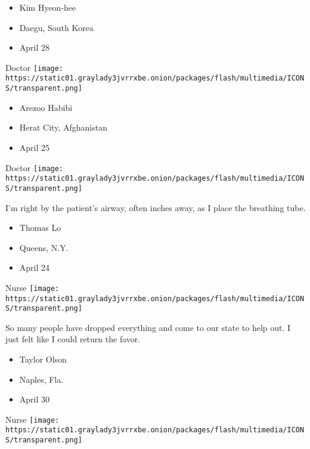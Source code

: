 \begin{itemize}
\tightlist
\item
  Kim Hyeon-hee
\item
  Daegu, South Korea
\item
  April 28
\end{itemize}

\protect\hyperlink{item-arezoo-habibi}{}

Doctor
\texttt{[image: https://static01.graylady3jvrrxbe.onion/packages/flash/multimedia/ICONS/transparent.png]}

\begin{itemize}
\tightlist
\item
  Arezoo Habibi
\item
  Herat City, Afghanistan
\item
  April 25
\end{itemize}

\protect\hyperlink{item-thomas-lo}{}

Doctor
\texttt{[image: https://static01.graylady3jvrrxbe.onion/packages/flash/multimedia/ICONS/transparent.png]}

I'm right by the patient's airway, often inches away, as I place the
breathing tube.

\begin{itemize}
\tightlist
\item
  Thomas Lo
\item
  Queens, N.Y.
\item
  April 24
\end{itemize}

\protect\hyperlink{item-taylor-olson}{}

Nurse
\texttt{[image: https://static01.graylady3jvrrxbe.onion/packages/flash/multimedia/ICONS/transparent.png]}

So many people have dropped everything and come to our state to help
out. I just felt like I could return the favor.

\begin{itemize}
\tightlist
\item
  Taylor Olson
\item
  Naples, Fla.
\item
  April 30
\end{itemize}

\protect\hyperlink{item-brooke-spence}{}

Nurse
\texttt{[image: https://static01.graylady3jvrrxbe.onion/packages/flash/multimedia/ICONS/transparent.png]}


